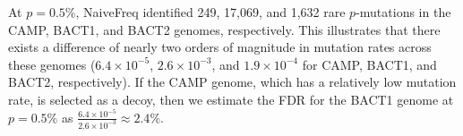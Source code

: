 At $p=0.5$\%, NaiveFreq identified 249, 17,069, and 1,632 rare $p$-mutations in the CAMP, BACT1, and BACT2 genomes, respectively. This illustrates that there exists a difference of nearly two orders of magnitude in mutation rates across these genomes ($6.4 \times 10^{-5}$, $2.6 \times 10^{-3}$, and $1.9 \times 10^{-4}$ for CAMP, BACT1, and BACT2, respectively). If the CAMP genome, which has a relatively low mutation rate, is selected as a decoy, then we estimate the FDR for the BACT1 genome at $p=0.5\%$ as $\frac{6.4 \times 10^{-5}}{2.6 \times 10^{-3}} \approx 2.4\%$.\endinput
